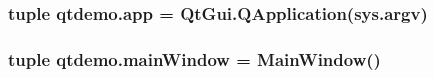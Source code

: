\subsubsection[{app}]{\setlength{\rightskip}{0pt plus 5cm}tuple qtdemo.\+app = Qt\+Gui.\+Q\+Application(sys.\+argv)}\label{namespaceqtdemo_a70fcccf7203edfc66d877dc1675c11b0}
\hypertarget{namespaceqtdemo_ad710b195aacd938d943f54fe1400c8fa}{}
\subsubsection[{main\+Window}]{\setlength{\rightskip}{0pt plus 5cm}tuple qtdemo.\+main\+Window = {\bf Main\+Window}()}\label{namespaceqtdemo_ad710b195aacd938d943f54fe1400c8fa}
